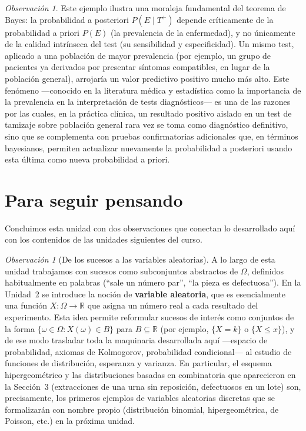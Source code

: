 \documentclass[11pt,a4paper]{article}
\theoremstyle{plain}
\theoremstyle{definition}
\theoremstyle{remark}
\newtheorem{observacion}[teorema]{Observación}
\begin{document}
\begin{observacion}
Este ejemplo ilustra una moraleja fundamental del teorema de Bayes: la probabilidad a posteriori $P(E\mid T^+)$ depende críticamente de la probabilidad a priori $P(E)$ (la prevalencia de la enfermedad), y no únicamente de la calidad intrínseca del test (su sensibilidad y especificidad). Un mismo test, aplicado a una población de mayor prevalencia (por ejemplo, un grupo de pacientes ya derivados por presentar síntomas compatibles, en lugar de la población general), arrojaría un valor predictivo positivo mucho más alto. Este fenómeno —conocido en la literatura médica y estadística como la importancia de la prevalencia en la interpretación de tests diagnósticos— es una de las razones por las cuales, en la práctica clínica, un resultado positivo aislado en un test de tamizaje sobre población general rara vez se toma como diagnóstico definitivo, sino que se complementa con pruebas confirmatorias adicionales que, en términos bayesianos, permiten actualizar nuevamente la probabilidad a posteriori usando esta última como nueva probabilidad a priori.
\end{observacion}

\section{Para seguir pensando}

Concluimos esta unidad con dos observaciones que conectan lo desarrollado aquí con los contenidos de las unidades siguientes del curso.

\begin{observacion}[De los sucesos a las variables aleatorias]
A lo largo de esta unidad trabajamos con sucesos como subconjuntos abstractos de $\Omega$, definidos habitualmente en palabras (``sale un número par'', ``la pieza es defectuosa''). En la Unidad~2 se introduce la noción de \textbf{variable aleatoria}, que es esencialmente una función $X:\Omega\to\mathbb{R}$ que asigna un número real a cada resultado del experimento. Esta idea permite reformular sucesos de interés como conjuntos de la forma $\{\omega\in\Omega : X(\omega)\in B\}$ para $B\subseteq\mathbb{R}$ (por ejemplo, $\{X=k\}$ o $\{X\leq x\}$), y de ese modo trasladar toda la maquinaria desarrollada aquí —espacio de probabilidad, axiomas de Kolmogorov, probabilidad condicional— al estudio de funciones de distribución, esperanza y varianza. En particular, el esquema hipergeométrico y las distribuciones basadas en combinatoria que aparecieron en la Sección~3 (extracciones de una urna sin reposición, defectuosos en un lote) son, precisamente, los primeros ejemplos de variables aleatorias discretas que se formalizarán con nombre propio (distribución binomial, hipergeométrica, de Poisson, etc.) en la próxima unidad.
\end{observacion}
\end{document}
